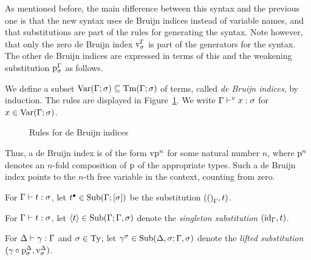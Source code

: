 As mentioned before, the main difference between this syntax and the previous one is that the new syntax uses de Bruijn indices instead of variable names, and that substitutions are part of the rules for generating the syntax. Note however, that only the zero de Bruijn index $\vz[\Gamma][\sigma]$ is part of the generators for the syntax. The other de Bruijn indices are expressed in terms of this and the weakening substitution $\spsub[\Gamma][\sigma]$ as follows.

\begin{defn}
We define a subset $\sVar{\Gamma}{\sigma} \subs \sTm{\Gamma}{\sigma}$ of terms, called \emph{de Bruijn indices}, by induction. The rules are displayed in Figure~\ref{fig:stlc2-de-Bruijn-indices}. We write $\stypedvar{x}{\Gamma}{\sigma}$ for $x \in \sVar{\Gamma}{\sigma}$.

\begin{figure}[ht]
\caption{Rules for de Bruijn indices}
\label{fig:stlc2-de-Bruijn-indices}
\end{figure}
\end{defn}

Thus, a de Bruijn index is of the form $\ssubst{\vz}{\spsub^n}$ for some natural number $n$, where $\spsub^n$ denotes an $n$-fold composition of $\spsub$ of the appropriate types. Such a de Bruijn index points to the $n$-th free variable in the context, counting from zero.


\begin{notn} \label{not:special-subs}
\begin{enum}
\item For $\stypedtm{t}{\Gamma}{\sigma}$, let $\stmsub{t} \in \sSub{\Gamma}{[\sigma]}$ be the substitution $\sextsub{\sempsub[\Gamma]}{t}$.
\item For $\stypedtm{t}{\Gamma}{\sigma}$, let $\ssingsub{t} \in \sSub{\Gamma}{\sextcon{\Gamma}{\sigma}}$ denote the \emph{singleton substitution} $\sextsub{\sidsub[\Gamma]}{t}$.
\item For $\stypedsub{\gamma}{\Delta}{\Gamma}$ and $\sigma \in \Ty$, let $\sliftsub[\sigma]{\gamma} \in \sSub{\sextcon{\Delta}{\sigma}}{\sextcon{\Gamma}{\sigma}}$ denote the \emph{lifted substitution} $\sextsub{\scompsub{\gamma}{\spsub[\Delta][\sigma]}}{\vz[\Delta][\sigma]}$.
\end{enum}
\end{notn}

